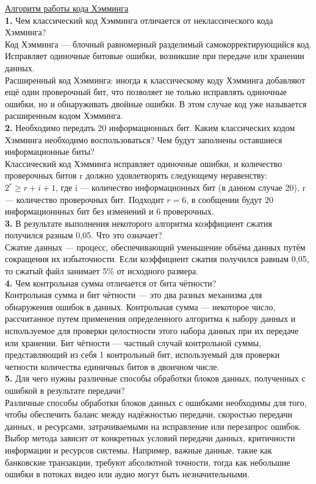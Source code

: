 


\noindent \href{https://www.youtube.com/watch?v=QsBYshN5idw}{\Large{Алгоритм работы кода Хэмминга}} \\
\textbf{1.} Чем классический код Хэмминга отличается от неклассического кода Хэмминга? \\
Код Хэмминга — блочный равномерный разделимый самокорректирующийся код. Исправляет одиночные битовые ошибки, возникшие при передаче или хранении данных. \\
Расширенный код Хэмминга: иногда к классическому коду Хэмминга добавляют ещё один проверочный бит, что позволяет не только исправлять одиночные ошибки, но и обнаруживать двойные ошибки. В этом случае код уже называется расширенным кодом Хэмминга. \\
\textbf{2.} Необходимо передать 20 информационных бит. Каким классических кодом Хэмминга необходимо воспользоваться? Чем будут заполнены оставшиеся информационные биты? \\
Классический код Хэмминга исправляет одиночные ошибки, и количество проверочных битов r должно удовлетворять следующему неравенству: $2^r \geq r + i + 1$, где i — количество информационных бит (в данном случае 20), r — количество проверочных бит. Подходит $r = 6$, в сообщении будут 20 информационнных бит без изменений и 6 проверочных. \\
\textbf{3.} В результате выполнения некоторого алгоритма коэффициент сжатия получился разным 0,05. Что это означает? \\
Сжатие данных — процесс, обеспечивающий уменьшение объёма данных путём сокращения их избыточности. Если коэффициент сжатия получился равным 0,05, то сжатый файл занимает 5\% от исходного размера. \\
\textbf{4.} Чем контрольная сумма отличается от бита чётности? \\
Контрольная сумма и бит чётности — это два разных механизма для обнаружения ошибок в данных. Контрольная сумма — некоторое число, рассчитанное путем применения определенного алгоритма к набору данных и используемое для проверки целостности этого набора данных при их передаче или хранении. Бит чётности — частный случай контрольной суммы, представляющий из себя 1 контрольный бит, используемый для проверки четности количества единичных битов в двоичном числе. \\
\textbf{5.} Для чего нужны различные способы обработки блоков данных, полученных с ошибкой в результате передачи? \\
Различные способы обработки блоков данных с ошибками необходимы для того, чтобы обеспечить баланс между надёжностью передачи, скоростью передачи данных, и ресурсами, затрачиваемыми на исправление или перезапрос ошибок. Выбор метода зависит от конкретных условий передачи данных, критичности информации и ресурсов системы. Например, важные данные, такие как банковские транзакции, требуют абсолютной точности, тогда как небольшие ошибки в потоках видео или аудио могут быть незначительными. \\
